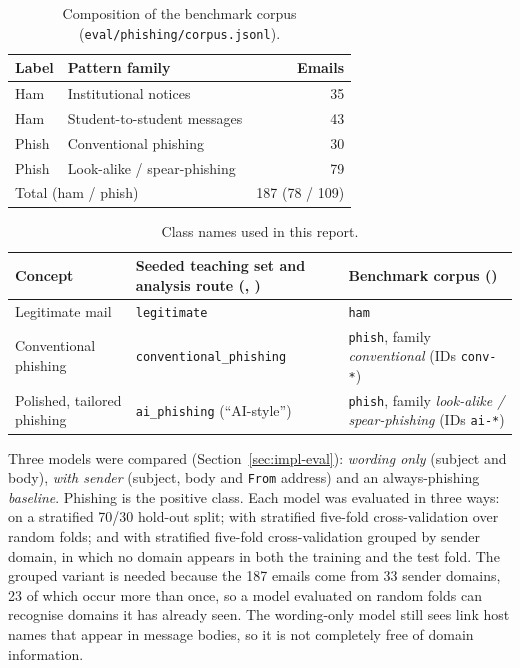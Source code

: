 \begin{table}[htbp]
\centering
\caption{Composition of the benchmark corpus (\texttt{eval/phishing/corpus.jsonl}).}
\label{tab:corpus}
\scriptsize
\begin{tabular}{llr}
\toprule
Label & Pattern family & Emails \\
\midrule
Ham & Institutional notices & 35 \\
Ham & Student-to-student messages & 43 \\
Phish & Conventional phishing & 30 \\
Phish & Look-alike / spear-phishing & 79 \\
\midrule
\multicolumn{2}{l}{Total (ham / phish)} & 187 (78 / 109) \\
\bottomrule
\end{tabular}
\end{table}

\begin{table}[htbp]
\centering
\caption{Class names used in this report.}
\label{tab:classes}
\scriptsize
\begin{tabular}{P{3.2cm}P{4.4cm}P{4.4cm}}
\toprule
Concept & Seeded teaching set and analysis route (, ) & Benchmark corpus () \\
\midrule
Legitimate mail & \texttt{legitimate} & \texttt{ham} \\
Conventional phishing & \texttt{conventional\_phishing} & \texttt{phish}, family \emph{conventional} (IDs \texttt{conv-*}) \\
Polished, tailored phishing & \texttt{ai\_phishing} (``AI-style'') & \texttt{phish}, family \emph{look-alike / spear-phishing} (IDs \texttt{ai-*}) \\
\bottomrule
\end{tabular}
\end{table}

Three models were compared (Section~\ref{sec:impl-eval}): \emph{wording only} (subject and body), \emph{with sender} (subject, body and \texttt{From} address) and an always-phishing \emph{baseline}. Phishing is the positive class. Each model was evaluated in three ways: on a stratified 70/30 hold-out split; with stratified five-fold cross-validation over random folds; and with stratified five-fold cross-validation grouped by sender domain, in which no domain appears in both the training and the test fold. The grouped variant is needed because the 187 emails come from 33 sender domains, 23 of which occur more than once, so a model evaluated on random folds can recognise domains it has already seen. The wording-only model still sees link host names that appear in message bodies, so it is not completely free of domain information.

